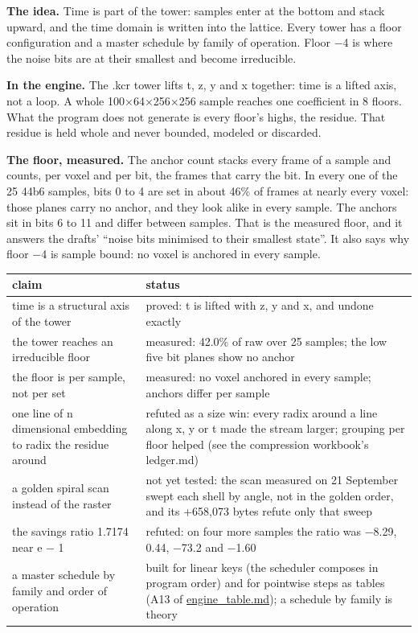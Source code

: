 \textbf{The idea.} Time is part of the tower: samples enter at the bottom and stack upward, and the time domain is written into the lattice. Every tower has a floor configuration and a master schedule by family of operation. Floor −4 is where the noise bits are at their smallest and become irreducible.

\textbf{In the engine.} The .kcr tower lifts t, z, y and x together: time is a lifted axis, not a loop. A whole 100×64×256×256 sample reaches one coefficient in 8 floors. What the program does not generate is every floor's highs, the residue. That residue is held whole and never bounded, modeled or discarded.

\textbf{The floor, measured.} The anchor count stacks every frame of a sample and counts, per voxel and per bit, the frames that carry the bit. In every one of the 25 44b6 samples, bits 0 to 4 are set in about 46\% of frames at nearly every voxel: those planes carry no anchor, and they look alike in every sample. The anchors sit in bits 6 to 11 and differ between samples. That is the measured floor, and it answers the drafts' “noise bits minimised to their smallest state”. It also says why floor −4 is sample bound: no voxel is anchored in every sample.

{\small
\setlength{\tabcolsep}{6pt}
\begin{longtable}{>{\RaggedRight\arraybackslash}p{}>{\RaggedRight\arraybackslash}p{}}
\toprule
claim & status \\
\midrule
\endhead
time is a structural axis of the tower & proved: t is lifted with z, y and x, and undone exactly \\
the tower reaches an irreducible floor & measured: 42.0\% of raw over 25 samples; the low five bit planes show no anchor \\
the floor is per sample, not per set & measured: no voxel anchored in every sample; anchors differ per sample \\
one line of n dimensional embedding to radix the residue around & refuted as a size win: every radix around a line along x, y or t made the stream larger; grouping per floor helped (see the compression workbook's ledger.md) \\
a golden spiral scan instead of the raster & not yet tested: the scan measured on 21 September swept each shell by angle, not in the golden order, and its +658,073 bytes refute only that sweep \\
the savings ratio 1.7174 near e − 1 & refuted: on four more samples the ratio was −8.29, 0.44, −73.2 and −1.60 \\
a master schedule by family and order of operation & built for linear keys (the scheduler composes in program order) and for pointwise steps as tables (A13 of \hyperref[chap:engine-table]{engine\_\allowbreak{}table.md}); a schedule by family is theory \\
\bottomrule
\end{longtable}
}

